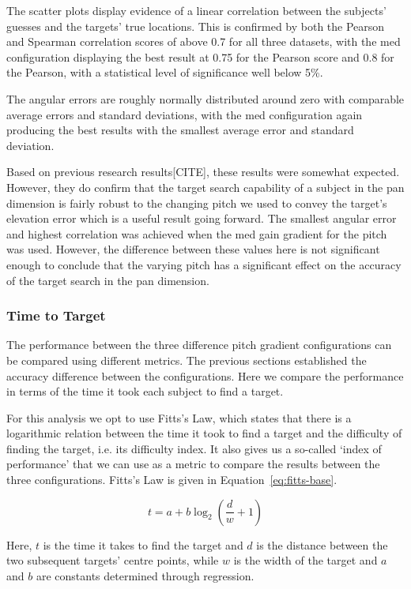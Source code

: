 \documentclass[format=sigconf, review=true, screen=true, anonymous=true]{acmart}
\begin{document}
The scatter plots display evidence of a linear correlation between the subjects' guesses and the targets' true locations. This is confirmed by both the Pearson and Spearman correlation scores of above 0.7 for all three datasets, with the med configuration displaying the best result at 0.75 for the Pearson score and 0.8 for the Pearson, with a statistical level of significance well below 5\%. 

The angular errors are roughly normally distributed around zero with comparable average errors and standard deviations, with the med configuration again producing the best results with the smallest average error and standard deviation. 

Based on previous research results[CITE], these results were somewhat expected. However, they do confirm that the target search capability of a subject in the pan dimension is fairly robust to the changing pitch we used to convey the target's elevation error which is a useful result going forward. The smallest angular error and highest correlation was achieved when the med gain gradient for the pitch was used. However, the difference between these values here is not significant enough to conclude that the varying pitch has a significant effect on the accuracy of the target search in the pan dimension. 

\subsubsection{Time to Target}

The performance between the three difference pitch gradient configurations can be compared using different metrics. The previous sections established the accuracy difference between the configurations. Here we compare the performance in terms of the time it took each subject to find a target. 

For this analysis we opt to use Fitts's Law, which states that there is a logarithmic relation between the time it took to find a target and the difficulty of finding the target, i.e. its difficulty index. It also gives us a so-called `index of performance' that we can use as a metric to compare the results between the three configurations. Fitts's Law is given in Equation~\ref{eq:fitts-base}. 


\begin{equation}
  \label{eq:fitts-base}
  t = a + b\log_2\left(\frac{d}{w} + 1\right)
\end{equation}

Here, $t$ is the time it takes to find the target and $d$ is the distance between the two subsequent targets' centre points, while $w$ is the width of the target and $a$ and $b$ are constants determined through regression.
\end{document}
